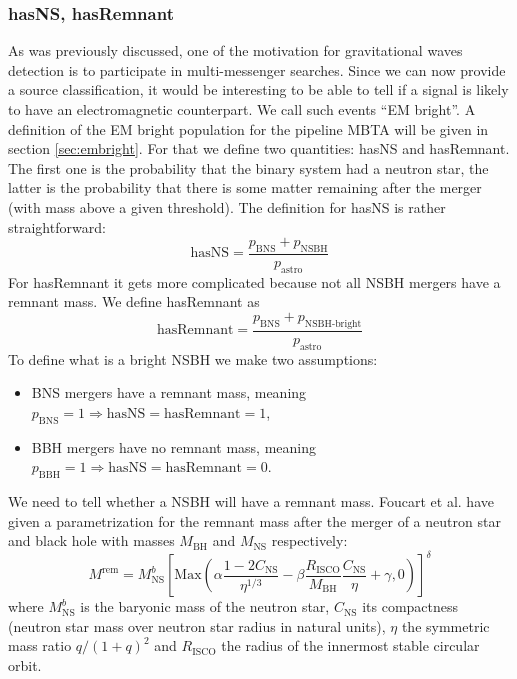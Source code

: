 \subsubsection{hasNS, hasRemnant}
As was previously discussed, one of the motivation for gravitational waves detection is to participate in multi-messenger searches.
Since we can now provide a source classification, it would be interesting to be able to tell if a signal is likely to have an electromagnetic counterpart.
We call such events ``EM bright''.
A definition of the EM bright population for the pipeline MBTA will be given in section \ref{sec:embright}.
For that we define two quantities: hasNS and hasRemnant.
The first one is the probability that the binary system had a neutron star, the latter is the probability that there is some matter remaining after the merger (with mass above a given threshold).
The definition for hasNS is rather straightforward:
%
\begin{equation}
  \textrm{hasNS} = \frac{p_{\textrm{BNS}} + p_{\textrm{NSBH}}}{p_{\textrm{astro}}}
\end{equation}
%
For hasRemnant it gets more complicated because not all NSBH mergers have a remnant mass.
We define hasRemnant as
%
\begin{equation}
  \textrm{hasRemnant} = \frac{p_{\textrm{BNS}} + p_{\textrm{NSBH-bright}}}{p_{\textrm{astro}}}
\end{equation}
%
To define what is a bright NSBH we make two assumptions:
\begin{itemize}
\item BNS mergers have a remnant mass, meaning $p_{\textrm{BNS}}=1 \Rightarrow \textrm{hasNS}=\textrm{hasRemnant}=1$,
\item BBH mergers have no remnant mass, meaning $p_{\textrm{BBH}}=1 \Rightarrow \textrm{hasNS}=\textrm{hasRemnant}=0$.
\end{itemize}
We need to tell whether a NSBH will have a remnant mass.
Foucart et al. \cite{remnant} have given a parametrization for the remnant mass after the merger of a neutron star and black hole with masses $M_{\textrm{BH}}$ and $M_{\textrm{NS}}$ respectively:
%
\begin{equation}
  M^{\textrm{rem}} = M^b_{\textrm{NS}} \left[ \textrm{Max}\left( \alpha \frac{1-2C_{\textrm{NS}}}{\eta^{1/3}} -\beta \frac{R_{\textrm{ISCO}}}{M_{\textrm{BH}}} \frac{C_{\textrm{NS}}}{\eta} + \gamma, 0 \right) \right]^\delta
\end{equation}
%
where $M^b_{\textrm{NS}}$ is the baryonic mass of the neutron star, $C_{\textrm{NS}}$ its compactness (neutron star mass over neutron star radius in natural units), $\eta$ the symmetric mass ratio $q/(1+q)^2$ and $R_{\textrm{ISCO}}$ the radius of the innermost stable circular orbit.
